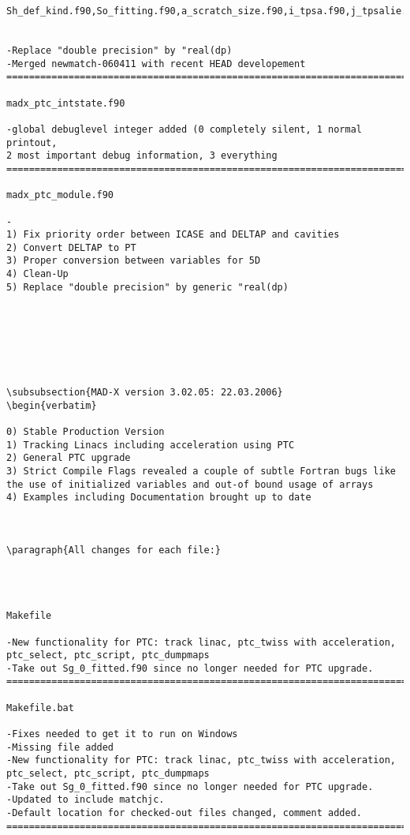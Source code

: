 \begin{verbatim}
Sh_def_kind.f90,So_fitting.f90,a_scratch_size.f90,i_tpsa.f90,j_tpsalie.f90,


-Replace "double precision" by "real(dp)
-Merged newmatch-060411 with recent HEAD developement
=============================================================================

madx_ptc_intstate.f90

-global debuglevel integer added (0 completely silent, 1 normal printout,
2 most important debug information, 3 everything
=============================================================================

madx_ptc_module.f90

-
1) Fix priority order between ICASE and DELTAP and cavities
2) Convert DELTAP to PT
3) Proper conversion between variables for 5D
4) Clean-Up
5) Replace "double precision" by generic "real(dp)







\subsubsection{MAD-X version 3.02.05: 22.03.2006}
\begin{verbatim}

0) Stable Production Version 
1) Tracking Linacs including acceleration using PTC
2) General PTC upgrade
3) Strict Compile Flags revealed a couple of subtle Fortran bugs like
the use of initialized variables and out-of bound usage of arrays
4) Examples including Documentation brought up to date



\paragraph{All changes for each file:}




Makefile

-New functionality for PTC: track linac, ptc_twiss with acceleration, 
ptc_select, ptc_script, ptc_dumpmaps
-Take out Sg_0_fitted.f90 since no longer needed for PTC upgrade.
=============================================================================

Makefile.bat

-Fixes needed to get it to run on Windows
-Missing file added
-New functionality for PTC: track linac, ptc_twiss with acceleration, 
ptc_select, ptc_script, ptc_dumpmaps
-Take out Sg_0_fitted.f90 since no longer needed for PTC upgrade.
-Updated to include matchjc.
-Default location for checked-out files changed, comment added.
=============================================================================


\end{verbatim}
